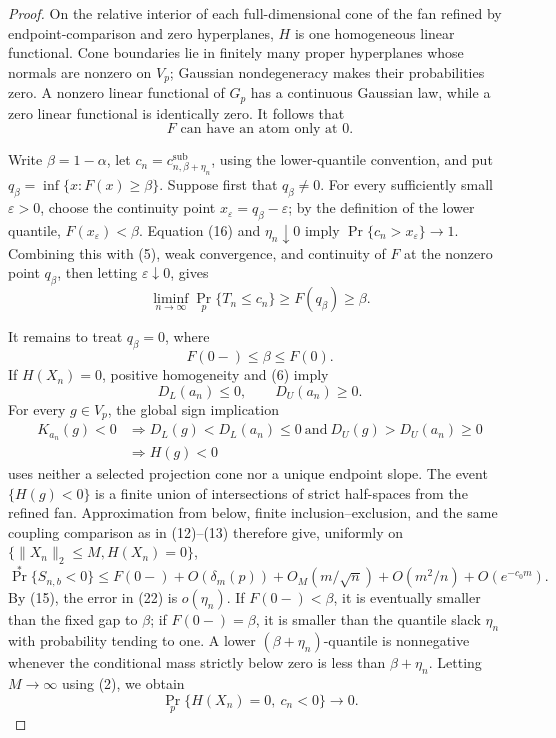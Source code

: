 \documentclass{article}
\begin{document}
\begin{proof}
On the relative interior of each full-dimensional cone of the fan refined by endpoint-comparison and zero hyperplanes, \(H\) is one homogeneous linear functional. Cone boundaries lie in finitely many proper hyperplanes whose normals are nonzero on \(V_p\); Gaussian nondegeneracy makes their probabilities zero. A nonzero linear functional of \(G_p\) has a continuous Gaussian law, while a zero linear functional is identically zero. It follows that
\[
F\text{ can have an atom only at }0.
\tag{17}
\]

Write \(\beta=1-\alpha\), let \(c_n=c^{\mathrm{sub}}_{n,\beta+\eta_n}\), using the lower-quantile convention, and put \(q_\beta=\inf\{x:F(x)\geq\beta\}\). Suppose first that \(q_\beta\neq0\). For every sufficiently small \(\varepsilon>0\), choose the continuity point \(x_\varepsilon=q_\beta-\varepsilon\); by the definition of the lower quantile, \(F(x_\varepsilon)<\beta\). Equation (16) and \(\eta_n\downarrow0\) imply \(\Pr\{c_n>x_\varepsilon\}\to1\). Combining this with (5), weak convergence, and continuity of \(F\) at the nonzero point \(q_\beta\), then letting \(\varepsilon\downarrow0\), gives
\[
\liminf_{n\to\infty}\Pr_p\{T_n\leq c_n\}
\geq F(q_\beta)\geq\beta.
\tag{18}
\]

It remains to treat \(q_\beta=0\), where
\[
F(0-)\leq\beta\leq F(0).
\tag{19}
\]
If \(H(X_n)=0\), positive homogeneity and (6) imply
\[
D_L(a_n)\leq0,
\qquad
D_U(a_n)\geq0.
\tag{20}
\]
For every \(g\in V_p\), the global sign implication
\[
\begin{aligned}
K_{a_n}(g)<0
&\Longrightarrow D_L(g)<D_L(a_n)\leq0
\ \text{and}\ D_U(g)>D_U(a_n)\geq0\\
&\Longrightarrow H(g)<0
\end{aligned}
\tag{21}
\]
uses neither a selected projection cone nor a unique endpoint slope. The event \(\{H(g)<0\}\) is a finite union of intersections of strict half-spaces from the refined fan. Approximation from below, finite inclusion--exclusion, and the same coupling comparison as in (12)--(13) therefore give, uniformly on \(\{\|X_n\|_2\leq M,H(X_n)=0\}\),
\[
\Pr^*\{S_{n,b}<0\}
\leq F(0-)+O(\delta_m(p))+O_M(m/\sqrt n)
+O(m^2/n)+O(e^{-c_0m}).
\tag{22}
\]
By (15), the error in (22) is \(o(\eta_n)\). If \(F(0-)<\beta\), it is eventually smaller than the fixed gap to \(\beta\); if \(F(0-)=\beta\), it is smaller than the quantile slack \(\eta_n\) with probability tending to one. A lower \((\beta+\eta_n)\)-quantile is nonnegative whenever the conditional mass strictly below zero is less than \(\beta+\eta_n\). Letting \(M\to\infty\) using (2), we obtain
\[
\Pr_p\{H(X_n)=0,\ c_n<0\}\longrightarrow0.
\tag{23}
\]


\end{proof}
\end{document}

